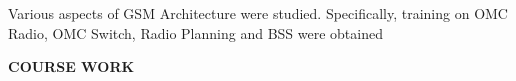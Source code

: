 \documentclass[a4paper,10pt]{article}
\begin{document}
\begin{itemize}
  Various aspects of GSM Architecture were studied. Specifically, training on OMC Radio, OMC Switch, Radio Planning and BSS were 
  obtained

% 
% 
% 
% 
% 


 \end{itemize}






 \colorbox{titleColor}{\parbox{6.5in}{\textbf{COURSE WORK}}}

%
\end{document}
